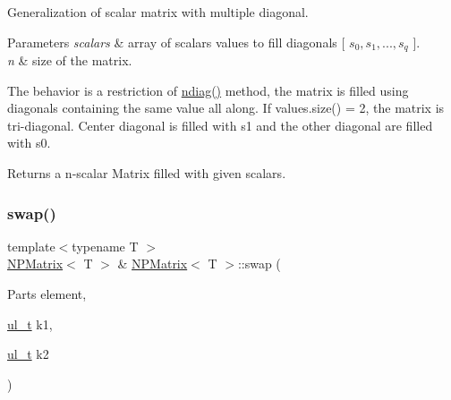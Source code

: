Generalization of scalar matrix with multiple diagonal. 


\begin{DoxyParams}{Parameters}
{\em scalars} & array of scalars values to fill diagonals {\ttfamily \mbox{[}} $ s_0, s_1, ..., s_q $ {\ttfamily \mbox{]}}. \\
\hline
{\em n} & size of the matrix.\\
\hline
\end{DoxyParams}
The behavior is a restriction of {\ttfamily \mbox{\hyperlink{class_n_p_matrix_a16aa6a18c33005300049ab1a39cbfbc2}{ndiag()}}} method, the matrix is filled using diagonals containing the same value all along. If {\ttfamily values.\+size() = 2}, the matrix is tri-\/diagonal. Center diagonal is filled with s1 and the other diagonal are filled with s0. \begin{DoxyReturn}{Returns}
a n-\/scalar Matrix filled with given {\ttfamily scalars}. 
\end{DoxyReturn}
\mbox{\label{class_n_p_matrix_aafbf2155265a070f3ae418828e40359e}} 
\subsubsection{\texorpdfstring{swap()}{swap()}\hspace{0.1cm}{\footnotesize\ttfamily [2/2]}}
{\footnotesize\ttfamily template$<$typename T $>$ \\
\mbox{\hyperlink{class_n_p_matrix}{N\+P\+Matrix}}$<$ T $>$ \& \mbox{\hyperlink{class_n_p_matrix}{N\+P\+Matrix}}$<$ T $>$\+::swap (\begin{DoxyParamCaption}\item[{Parts}]{element,  }\item[{\mbox{\hyperlink{typedef_8h_a1b140a2034db3f5dfe18a987745df43a}{ul\+\_\+t}}}]{k1,  }\item[{\mbox{\hyperlink{typedef_8h_a1b140a2034db3f5dfe18a987745df43a}{ul\+\_\+t}}}]{k2 }\end{DoxyParamCaption})\hspace{0.3cm}{\ttfamily [protected]}}

\mbox{\label{class_n_p_matrix_a83118d4efa26372fd12bd0a2ce77f155}} 

